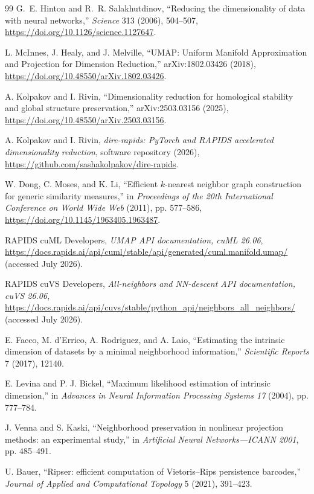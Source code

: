 \documentclass[10pt]{article}
\begin{document}
\begin{thebibliography}{99}
G.~E. Hinton and R.~R. Salakhutdinov,
``Reducing the dimensionality of data with neural networks,''
\emph{Science} 313 (2006), 504--507,
\url{https://doi.org/10.1126/science.1127647}.

L. McInnes, J. Healy, and J. Melville,
``UMAP: Uniform Manifold Approximation and Projection for Dimension Reduction,''
arXiv:1802.03426 (2018),
\url{https://doi.org/10.48550/arXiv.1802.03426}.

A. Kolpakov and I. Rivin,
``Dimensionality reduction for homological stability and global structure preservation,''
arXiv:2503.03156 (2025),
\url{https://doi.org/10.48550/arXiv.2503.03156}.

A. Kolpakov and I. Rivin,
\emph{dire-rapids: PyTorch and RAPIDS accelerated dimensionality reduction},
software repository (2026),
\url{https://github.com/sashakolpakov/dire-rapids}.

W. Dong, C. Moses, and K. Li,
``Efficient $k$-nearest neighbor graph construction for generic similarity measures,''
in \emph{Proceedings of the 20th International Conference on World Wide Web}
(2011), pp. 577--586,
\url{https://doi.org/10.1145/1963405.1963487}.

RAPIDS cuML Developers,
\emph{UMAP API documentation, cuML 26.06},
\url{https://docs.rapids.ai/api/cuml/stable/api/generated/cuml.manifold.umap/}
(accessed July 2026).

RAPIDS cuVS Developers,
\emph{All-neighbors and NN-descent API documentation, cuVS 26.06},
\url{https://docs.rapids.ai/api/cuvs/stable/python_api/neighbors_all_neighbors/}
(accessed July 2026).

E. Facco, M. d'Errico, A. Rodriguez, and A. Laio,
``Estimating the intrinsic dimension of datasets by a minimal neighborhood information,''
\emph{Scientific Reports} 7 (2017), 12140.

E. Levina and P. J. Bickel,
``Maximum likelihood estimation of intrinsic dimension,''
in \emph{Advances in Neural Information Processing Systems 17} (2004), pp. 777--784.

J. Venna and S. Kaski,
``Neighborhood preservation in nonlinear projection methods: an experimental study,''
in \emph{Artificial Neural Networks---ICANN 2001}, pp. 485--491.

U. Bauer,
``Ripser: efficient computation of Vietoris--Rips persistence barcodes,''
\emph{Journal of Applied and Computational Topology} 5 (2021), 391--423.


\end{thebibliography}
\end{document}
